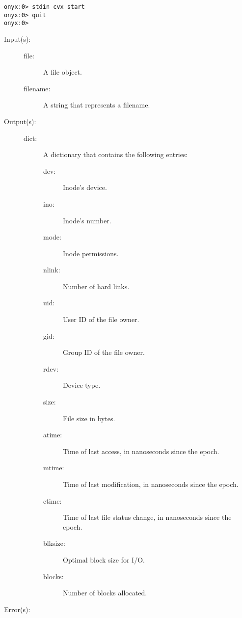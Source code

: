 \begin{description}
\begin{description}
\begin{verbatim}
onyx:0> stdin cvx start
onyx:0> quit
onyx:0>
		\end{verbatim}
	\end{description}
\label{systemdict:status}
\item[{\onyxop{file/filename}{status}{dict}}: ]
	\begin{description}\item[]
	\item[Input(s): ]
		\begin{description}\item[]
		\item[file: ]
			A file object.
		\item[filename: ]
			A string that represents a filename.
		\end{description}
	\item[Output(s): ]
		\begin{description}\item[]
		\item[dict: ]
			A dictionary that contains the following entries:
			\begin{description}%
			\item[dev: ]
				Inode's device.
			\item[ino: ]
				Inode's number.
			\item[mode: ]
				Inode permissions.
			\item[nlink: ]
				Number of hard links.
			\item[uid: ]
				User ID of the file owner.
			\item[gid: ]
				Group ID of the file owner.
			\item[rdev: ]
				Device type.
			\item[size: ]
				File size in bytes.
			\item[atime: ]
				Time of last access, in nanoseconds since the
				epoch.
			\item[mtime: ]
				Time of last modification, in nanoseconds since
				the epoch.
			\item[ctime: ]
				Time of last file status change, in nanoseconds
				since the epoch.
			\item[blksize: ]
				Optimal block size for I/O.
			\item[blocks: ]
				Number of blocks allocated.
			\end{description}
		\end{description}
	\item[Error(s): ]
		\begin{description}\item[]

\end{description}
\end{description}
\end{description}

